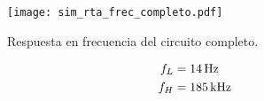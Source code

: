 \begin{figure}[H]	
	\centering
	\texttt{[image: sim\_rta\_frec\_completo.pdf]}
	\caption{Respuesta en frecuencia del circuito completo.}
	\label{fig:rta_frec}
\end{figure}

\begin{align}
	\centering
	f_{L} & = \SI{14}{\hertz}\\
	f_H & = \SI{185}{\kilo\hertz}
\end{align}
